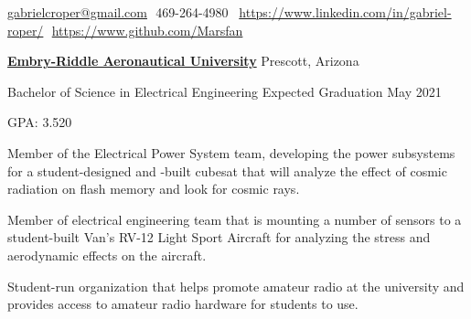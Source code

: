 \documentclass[letterpaper,ddMMMyyyy,nonstopmode]{simpleresumecv}
\makeatletter
\newcommand{\CVAuthor}{Gabriel Roper}
\newcommand{\LinkedInPage}{https://www.linkedin.com/in/gabriel-roper/}
\newcommand{\GithubPage}{https://www.github.com/Marsfan}
\newcommand{\emailAddress}{gabrielcroper@gmail.com}
\newcommand{\streetAddress}{}
\newcommand{\phoneNumber}{469-264-4980}
\newcommand{\GPA}{3.520}
\makeatother
\begin{document}
	\Title{\CVAuthor}

	\begin{SubTitle}
		{\streetAddress}
		\par
		\href{mailto:\emailAddress}{\emailAddress}
		\BulletSymbol
		\,\,\phoneNumber\,
		\BulletSymbol
		\,\,\href{\LinkedInPage}{\url{\LinkedInPage}}
		\BulletSymbol
		\,\,\href{\GithubPage}{\url{\GithubPage}}
	\end{SubTitle}

	\begin{Body}



            \Entry
            \href{https://prescott.erau.edu}{\textbf{Embry-Riddle Aeronautical University}}
            \hfill Prescott, Arizona

            Bachelor of Science in Electrical Engineering
            \hfill Expected Graduation May 2021

            \hfill GPA: \GPA



                {Member of the Electrical Power System team, developing the
                    power subsystems for a student-designed and -built
                    cubesat that will analyze the effect of cosmic radiation on
                    flash memory and look for cosmic rays.}

                {Member of electrical engineering team that is mounting a number of sensors
                    to a student-built Van's RV-12 Light Sport Aircraft for analyzing the
                    stress and aerodynamic effects on the aircraft.}


                {Student-run organization that helps promote amateur
                    radio at the university and provides access to amateur
                    radio hardware for students to use.
                    }


\end{Body}
\end{document}
